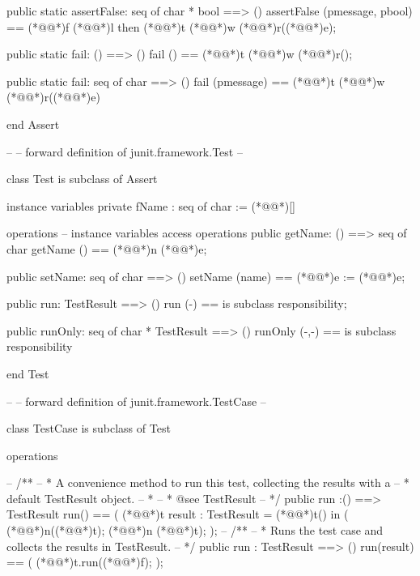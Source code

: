 \documentclass[a4paper]{article}
\begin{document}
\begin{vdm_al}
  public static assertFalse: seq of char * bool ==> ()
  assertFalse (pmessage, pbool) ==
    (*@@*)f (*@@*)l then (*@@*)t (*@@*)w (*@@*)r((*@@*)e);
    
  public static fail: () ==> ()
  fail () == (*@@*)t (*@@*)w (*@@*)r();
  
  public static fail: seq of char ==> ()
  fail (pmessage) == (*@@*)t (*@@*)w (*@@*)r((*@@*)e)
    
end Assert

--
-- forward definition of junit.framework.Test
--

class Test is subclass of Assert

instance variables
  private fName : seq of char := (*@\vdmnotcovered{}@*)[]
  
operations
  -- instance variables access operations
  public getName: () ==> seq of char
  getName () == (*@@*)n (*@@*)e;
  
  public setName: seq of char ==> ()
  setName (name) == (*@@*)e := (*@@*)e;
  
  public run: TestResult ==> ()
  run (-) == is subclass responsibility;
  
  public runOnly: seq of char * TestResult ==> ()
  runOnly (-,-) == is subclass responsibility
    
end Test

--
-- forward definition of junit.framework.TestCase
--

class TestCase is subclass of Test

operations

--  /**
--   * A convenience method to run this test, collecting the results with a
--   * default TestResult object.
--   *
--   * @see TestResult
--   */
    public run :() ==> TestResult
    run() ==
    (
        (*@@*)t result : TestResult = (*@@*)t() in (
        (*@@*)n((*@@*)t);
        (*@@*)n (*@@*)t);
    );
--  /**
--   * Runs the test case and collects the results in TestResult.
--   */
    public run : TestResult ==> ()
    run(result) ==
    (
        (*@@*)t.run((*@@*)f);
    );
 

\end{vdm_al}
\end{document}
